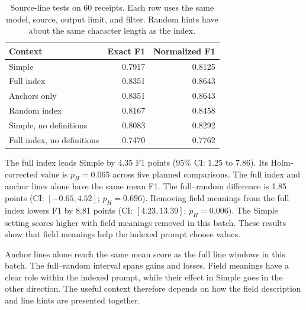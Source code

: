 \begin{table}[t]

\centering

\caption{Source-line tests on 60 receipts. Each row uses the same model, source, output limit, and filter. Random hints have about the same character length as the index.}
\label{tab:recovery_index}

\small

\begin{tabular}{lrr}

\toprule

Context & Exact F1 & Normalized F1 \\

\midrule

Simple & 0.7917 & 0.8125 \\

Full index & 0.8351 & 0.8643 \\

Anchors only & 0.8351 & 0.8643 \\

Random index & 0.8167 & 0.8458 \\

Simple, no definitions & 0.8083 & 0.8292 \\

Full index, no definitions & 0.7470 & 0.7762 \\

\bottomrule

\end{tabular}

\end{table}

The full index leads Simple by 4.35 F1 points (95\% CI: 1.25 to 7.86).
Its Holm-corrected value is $p_H=0.065$ across five planned comparisons.
The full index and anchor lines alone have the same mean F1.
The full--random difference is 1.85 points
(CI: $[-0.65,4.52]$; $p_H=0.696$).
Removing field meanings from the full index lowers F1 by 8.81 points
(CI: $[4.23,13.39]$; $p_H=0.006$).
The Simple setting scores higher with field meanings removed in this batch.
These results show that field meanings help the indexed prompt choose values.

Anchor lines alone reach the same mean score as the full line windows
in this batch. The full--random interval spans gains and losses.
Field meanings have a clear role within the indexed prompt, while their
effect in Simple goes in the other direction.
The useful context therefore depends on how the field description and
line hints are presented together.

